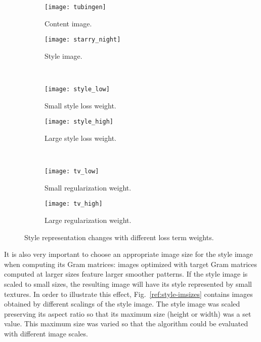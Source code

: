 \begin{figure}
	\centering
\begin{subfigure}[t]{0.45\textwidth}
	\texttt{[image: tubingen]}
	\caption{Content image.}
\end{subfigure}
\begin{subfigure}[t]{0.45\textwidth}
	\texttt{[image: starry\_night]}
	\caption{Style image.}
\end{subfigure}\\
\begin{subfigure}[t]{0.45\textwidth}
	\texttt{[image: style\_low]}
	\caption{Small style loss weight.}
\end{subfigure}
\begin{subfigure}[t]{0.45\textwidth}
	\texttt{[image: style\_high]}
	\caption{Large style loss weight.}		
\end{subfigure}\\
\begin{subfigure}[t]{0.45\textwidth}
	\texttt{[image: tv\_low]}
	\caption{Small regularization weight.}
\end{subfigure}
\begin{subfigure}[t]{0.45\textwidth}
	\texttt{[image: tv\_high]}
	\caption{Large regularization weight.}
\end{subfigure}
\caption{Style representation changes with different loss term weights.\label{fig:style-weights}}	
\end{figure}

It is also very important to choose an appropriate image size for the style image when computing its Gram matrices: images optimized with target Gram matrices computed at larger sizes feature larger smoother patterns. If the style image is scaled to small sizes, the resulting image will have its style represented by small textures. In order to illustrate this effect, Fig.~\ref{ref:style-imsizes} contains images obtained by different scalings of the style image. The style image was scaled preserving its aspect ratio so that its maximum size (height or width) was a set value. This maximum size was varied so that the algorithm could be evaluated with different image scales.

